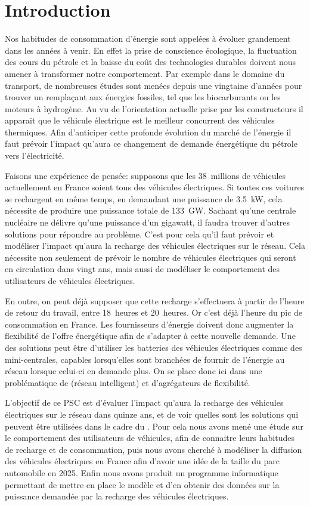 \section*{Introduction}

Nos habitudes de consommation d'énergie sont appelées à évoluer grandement dans les années à venir.
En effet la prise de conscience écologique, la fluctuation des cours du pétrole et la baisse du coût des technologies durables doivent nous amener à transformer notre comportement. 
Par exemple dans le domaine du transport, de nombreuses études sont menées depuis une vingtaine d'années pour trouver un remplaçant aux énergies fossiles, tel que les biocarburants ou les moteurs à hydrogène.
Au vu de l'orientation actuelle prise par les constructeurs il apparait que le véhicule électrique est le meilleur concurrent des véhicules thermiques. 
Afin d'anticiper cette profonde évolution du marché de l'énergie il faut prévoir l'impact qu'aura ce changement de demande énergétique du pétrole vers l'électricité. 

Faisons une expérience de pensée: supposons que les 38~millions de véhicules actuellement en France soient tous des véhicules électriques. Si toutes ces voitures se rechargent en même temps, en demandant une puissance de \SI{3.5}{\kilo\watt}, cela nécessite de produire une puissance totale de \SI{133}{\giga\watt}. Sachant qu'une centrale nucléaire ne délivre qu'une puissance d'un gigawatt, il faudra trouver d'autres solutions pour répondre au problème. C'est pour cela qu'il faut prévoir et modéliser l'impact qu'aura la recharge des véhicules électriques sur le réseau. Cela nécessite non seulement de prévoir le nombre de véhicules électriques qui seront en circulation dans vingt ans, mais aussi de modéliser le comportement des utilisateurs de véhicules électriques. 

En outre, on peut déjà supposer que cette recharge s'effectuera à partir de l'heure de retour du travail, entre 18~heures et 20~heures. Or c'est déjà l'heure du pic de consommation en France. Les fournisseurs d'énergie doivent donc augmenter la flexibilité de l'offre énergétique afin de s'adapter à cette nouvelle demande. Une des solutions peut être d'utiliser les batteries des véhicules électriques comme des \og{}mini-centrales\fg{}, capables lorsqu'elles sont branchées de fournir de l'énergie au réseau lorsque celui-ci en demande plus. On se place donc ici dans une problématique de \smartgrid{} (réseau intelligent) et d'agrégateurs de flexibilité. 

L'objectif de ce PSC est d'évaluer l'impact qu'aura la recharge des véhicules électriques sur le réseau dans quinze ans, et de voir quelles sont les solutions qui peuvent être utilisées dans le cadre du \smartgrid{}. Pour cela nous avons mené une étude sur le comportement des utilisateurs de véhicules, afin de connaitre leurs habitudes de recharge et de consommation, puis nous avons cherché à modéliser la diffusion des véhicules électriques en France afin d'avoir une idée de la taille du parc automobile en 2025. Enfin nous avons produit un programme informatique permettant de mettre en place le modèle et d'en obtenir des données sur la puissance demandée par la recharge des véhicules électriques.